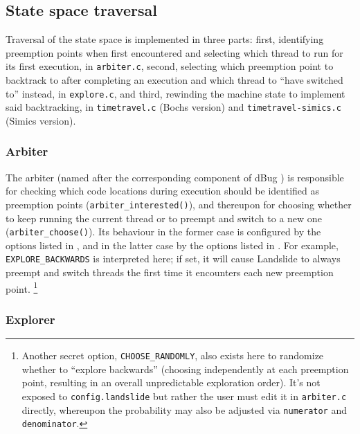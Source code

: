 
\subsection{State space traversal}
\label{sec:landslide-statespace}

Traversal of the state space is implemented in three parts:
first, identifying preemption points when first encountered and selecting which thread to run for its first execution, in {\tt arbiter.c},
second, selecting which preemption point to backtrack to after completing an execution
and which thread to ``have switched to'' %
instead, in {\tt explore.c},
and third, rewinding the machine state to implement said backtracking,
in {\tt timetravel.c} (Bochs version) and {\tt timetravel-simics.c} (Simics version).

\subsubsection{Arbiter}
\label{sec:landslide-arbiter}

The arbiter (named after the corresponding component of dBug \cite{dbug-ssv})
is responsible for checking which code locations during execution should be identified as preemption points
({\tt arbiter\_interested()}),
and thereupon for choosing whether to keep running the current thread or to preempt and switch to a new one
({\tt arbiter\_choose()}).
Its behaviour in the former case is configured by the options listed in \sect{\ref{sec:landslide-dynamicconfig}},
and in the latter case by the options listed in \sect{\ref{sec:landslide-staticconfig}}.
For example, {\tt EXPLORE\_BACKWARDS} is interpreted here;
if set, it will cause Landslide to always preempt and switch threads the first time it encounters each new preemption point.%
\footnote{Another secret option, {\tt CHOOSE\_RANDOMLY},
also exists here to randomize whether to ``explore backwards''
(choosing independently at each preemption point, resulting in an overall unpredictable exploration order).
It's not exposed to {\tt config.landslide} but rather the user must edit it in {\tt arbiter.c} directly,
whereupon the probability may also be adjusted via {\tt numerator} and {\tt denominator}.}

\subsubsection{Explorer}

